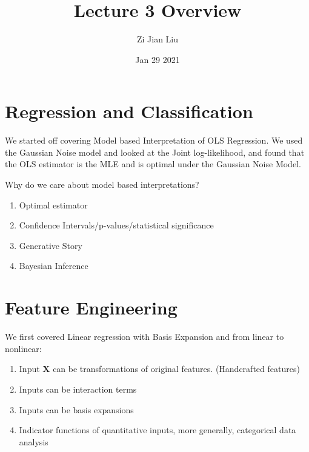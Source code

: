 \documentclass[twoside]{article}
\theoremstyle{definition}
\theoremstyle{definition}
\theoremstyle{remark}
\begin{document}
	\title{Lecture 3 Overview}
	\author{Zi Jian Liu}
	
	\date{Jan 29 2021}
	
	\maketitle
	
	\section*{Regression and Classification}
	
	We started off covering Model based Interpretation of OLS Regression. We used the Gaussian Noise model and looked at the Joint log-likelihood, and found that the OLS estimator is the MLE and is optimal under the Gaussian Noise Model.
	
	Why do we care about model based interpretations?
	\begin{enumerate}
	
		\item Optimal estimator
	
		\item Confidence Intervals/p-values/statistical significance
		
		\item Generative Story
		
		\item Bayesian Inference

	\end{enumerate}

	\section*{Feature Engineering}
	
	We first covered Linear regression with Basis Expansion and from linear to nonlinear:
	\begin{enumerate}
	
		\item Input $\boldsymbol{X}$ can be transformations of original features. (Handcrafted features)
	
		\item Inputs can be interaction terms
		
		\item Inputs can be basis expansions
		
		\item Indicator functions of quantitative inputs, more generally, categorical data analysis

	\end{enumerate}
	
\end{document}
